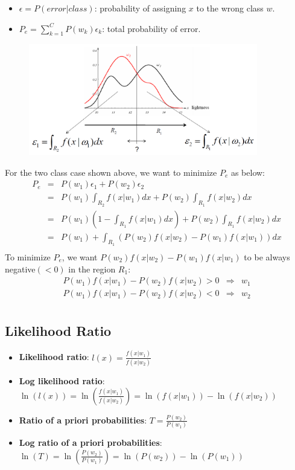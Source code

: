 \documentclass[letterpaper,10pt]{article}
\begin{document}
\begin{itemize}
	\item $\epsilon=P(error|class)$: probability of assigning $x$ to the wrong class $w$.
	\item $P_e=\sum_{k=1}^{C}{P(w_k)\epsilon_k}$: total probability of error.
\end{itemize}
\begin{figure}[!ht]
	\centering
	\includegraphics[width=10cm]{./img/minimum_probability_of_error.png}
\end{figure}
For the two class case shown above, we want to minimize $P_e$ as below:
\begin{equation}
\begin{array}{rcl}
P_e & = & P(w_1)\epsilon_1 + P(w_2)\epsilon_2 \\
	& = & P(w_1)\int_{R_2}{f(x|w_1)dx} + P(w_2)\int_{R_1}{f(x|w_2)dx} \\
	& = & P(w_1)(1-\int_{R_1}{f(x|w_1)dx}) + P(w_2)\int_{R_1}{f(x|w_2)dx} \\
	& = & P(w_1) + \int_{R_1}{(P(w_2)f(x|w_2) - P(w_1)f(x|w_1))dx} \\ 
\end{array}
\end{equation}
To minimize $P_e$, we want $P(w_2)f(x|w_2) - P(w_1)f(x|w_1)$ to be always negative$(<0)$ in the region $R_1$:
\begin{equation}
\begin{array}{rcl}
P(w_1)f(x|w_1) - P(w_2)f(x|w_2) >0 & \Rightarrow & w_1 \\
P(w_1)f(x|w_1) - P(w_2)f(x|w_2) <0 & \Rightarrow & w_2 \\
\end{array}
\end{equation}

\subsection{Likelihood Ratio}

\begin{itemize}
	\item \textbf{Likelihood ratio}: $l(x)=\frac{f(x|w_1)}{f(x|w_2)}$
	\item \textbf{Log likelihood ratio}: $\ln(l(x))=\ln(\frac{f(x|w_1)}{f(x|w_2)})=\ln(f(x|w_1))-\ln(f(x|w_2))$
	\item \textbf{Ratio of a priori probabilities}: $T=\frac{P(w_2)}{P(w_1)}$
	\item \textbf{Log ratio of a priori probabilities}: $\ln(T)=\ln(\frac{P(w_2)}{P(w_1)})=\ln(P(w_2))-\ln(P(w_1))$
\end{itemize}
\end{document}
